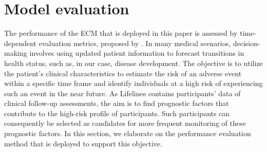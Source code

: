 \section{Model evaluation}
\label{section:methodology:model_evaluation}
The performance of the ECM that is deployed in this paper is assessed by time-dependent evaluation metrics, proposed by \cite{bansal2018tutorial}. In many medical scenarios, decision-making involves using updated patient information to forecast transitions in health status, such as, in our case, disease development. The objective is to utilize the patient's clinical characteristics to estimate the risk of an adverse event within a specific time frame and identify individuals at a high risk of experiencing such an event in the near future. As Lifelines contains participants' data of clinical follow-up assessments, the aim is to find prognostic factors that contribute to the high-risk profile of participants. Such participants can consequently be selected as candidates for more frequent monitoring of these prognostic factors. In this section, we elaborate on the performance evaluation method that is deployed to support this objective. 

